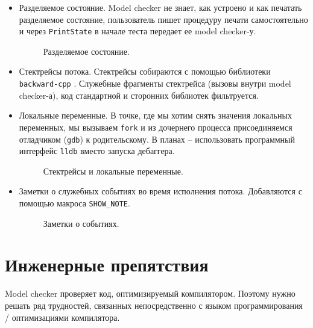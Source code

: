 \begin{itemize}
\item	Разделяемое состояние. Model checker не знает, как устроено и как печатать разделяемое состояние, пользователь пишет процедуру печати самостоятельно и через \texttt{PrintState} в начале теста передает ее model checker-у.

\begin{figure}
	\bigskip
	\caption{Разделяемое состояние.}
\end{figure}

\item	Стектрейсы потока. Стектрейсы собираются с помощью библиотеки \texttt{backward-cpp} \autocite{Backward}. Служебные фрагменты стектрейса (вызовы внутри model checker-а), код стандартной и сторонних библиотек фильтруется.

\item	Локальные переменные. В точке, где мы хотим снять значения локальных переменных, мы вызываем \texttt{fork} и из дочернего процесса присоединяемся отладчиком (\texttt{gdb}) к родительскому. В планах – использовать программный интерфейс \texttt{lldb} вместо запуска дебаггера.

\begin{figure}
	\bigskip
	\caption{Стектрейсы и локальные переменные.}
\end{figure}

\item	Заметки о служебных событиях во время исполнения потока. Добавляются с помощью макроса \texttt{SHOW_NOTE}.

\begin{figure}
	\bigskip
	\caption{Заметки о событиях.}
\end{figure}

\end{itemize}

\section{Инженерные препятствия}

Model checker проверяет код, оптимизируемый компилятором. Поэтому нужно решать ряд трудностей, связанных непосредственно с языком программирования / оптимизациями компилятора.

